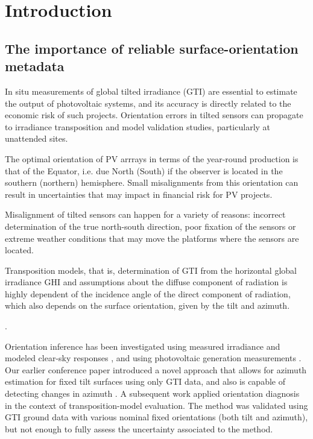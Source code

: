 \section{Introduction}\label{sec:introduction}

\subsection{The importance of reliable surface-orientation metadata}

In situ measurements of global tilted irradiance (GTI) are essential to estimate the output of photovoltaic systems, and its accuracy is directly related to the economic risk of such projects. Orientation errors in tilted sensors can propagate to irradiance transposition and model validation studies, particularly at unattended sites.

The optimal orientation of PV arrrays in terms of the year-round production is that of the Equator, i.e. due North (South) if the observer is located in the southern (northern) hemisphere. Small misalignments from this orientation can result in uncertainties that may impact in financial risk for PV projects. 

Misalignment of tilted sensors can happen for a variety of reasons: incorrect determination of the true north-south direction, poor fixation of the sensors or extreme weather conditions that may move the platforms where the sensors are located.

Transposition models, that is, determination of GTI from the horizontal global irradiance GHI and assumptions about the diffuse component of radiation is highly dependent of the incidence angle of the direct component  of radiation, which also depends on the surface orientation, given by the tilt and azimuth.

\citep{menyhart2015,urraca2017}.

Orientation inference has been investigated using measured irradiance and modeled clear-sky responses \citep{barbier2019,piccioli2021}, and using photovoltaic generation measurements \citep{meng2020}. Our earlier conference paper introduced a novel approach that allows for azimuth estimation for fixed tilt surfaces using only GTI data, and also is capable of detecting changes in azimuth \citep{piccioli2021}. A subsequent work \citep{piccioli2022thesis} applied orientation diagnosis in the context of transposition-model evaluation. The method was validated using GTI ground data with various nominal fixed orientations (both tilt and azimuth), but not enough to fully assess the uncertainty associated to the method.


